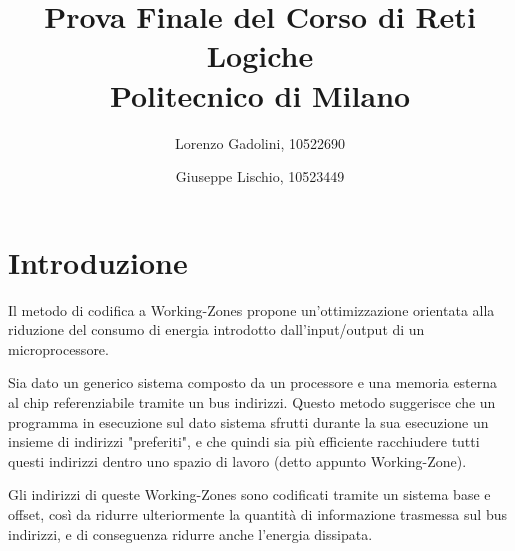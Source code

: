 \documentclass{article}
\begin{document}
\title{\Huge Prova Finale del Corso di Reti Logiche\\ \huge Politecnico di Milano}
\author{\Large Lorenzo Gadolini, 10522690 \and \Large Giuseppe Lischio, 10523449}
\date{}



\bigskip

\maketitle





\newpage

\tableofcontents





\newpage
{}




\setcounter{page}{1}


\section{Introduzione}
\begin{flushleft}
Il metodo di codifica a Working-Zones propone un'ottimizzazione orientata alla riduzione del consumo di energia introdotto dall'input/output di un microprocessore.

\medskip

Sia dato un generico sistema composto da un processore e una memoria esterna al chip referenziabile tramite un bus indirizzi. Questo metodo suggerisce che un programma in esecuzione sul dato sistema sfrutti durante la sua esecuzione un insieme di indirizzi "preferiti", e che quindi sia più efficiente racchiudere tutti questi indirizzi dentro uno spazio di lavoro (detto appunto Working-Zone). 

\medskip

Gli indirizzi di queste Working-Zones sono codificati tramite un sistema base e offset, così da ridurre ulteriormente la quantità di informazione trasmessa sul bus indirizzi, e di conseguenza ridurre anche l'energia dissipata.

\end{flushleft}

\bigskip
\end{document}
